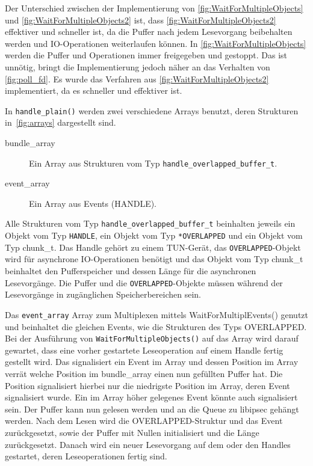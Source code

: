 {Der Unterschied zwischen der Implementierung von \autoref{fig:WaitForMultipleObjects}
und \autoref{fig:WaitForMultipleObjects2} ist, dass \autoref{fig:WaitForMultipleObjects2}
effektiver und schneller ist, da die Puffer nach jedem Lesevorgang beibehalten werden
und IO-Operationen weiterlaufen können.
In \autoref{fig:WaitForMultipleObjects} werden die Puffer und Operationen
immer freigegeben und gestoppt. Das ist unnötig, bringt die Implementierung
jedoch näher an das Verhalten von \autoref{fig:poll_fd}.
Es wurde das Verfahren aus \autoref{fig:WaitForMultipleObjects2} implementiert,
da es schneller und effektiver ist.

In \texttt{handle\_plain()} werden zwei verschiedene Arrays benutzt, deren Strukturen in~\autoref{fig:arrays}
dargestellt sind.

\begin{description}
\item[bundle\_array] Ein Array aus Strukturen vom Typ \texttt{handle\_overlapped\_buffer\_t}. 
\item[event\_array] Ein Array aus Events (HANDLE).
\end{description}

Alle Strukturen vom Typ \texttt{handle\_overlapped\_buffer\_t} beinhalten jeweils ein Objekt
vom Typ \texttt{HANDLE}, ein Objekt vom Typ \texttt{*OVERLAPPED} und ein Objekt vom Typ chunk\_t.
Das Handle gehört zu einem TUN-Gerät, das \texttt{OVERLAPPED}-Objekt wird für asynchrone
IO-Operationen benötigt und das Objekt vom Typ chunk\_t beinhaltet den Pufferspeicher und dessen Länge
für die asynchronen Lesevorgänge. Die Puffer und die \texttt{OVERLAPPED}-Objekte
müssen während der Lesevorgänge in zugänglichen Speicherbereichen sein.

Das \texttt{event\_array} Array zum Multiplexen mittels WaitForMultiplEvents() genutzt und
beinhaltet die gleichen Events, wie die Strukturen des Typs OVERLAPPED.
Bei der Ausführung von \texttt{WaitForMultipleObjects()} auf das Array wird darauf gewartet, dass
eine vorher gestartete Leseoperation auf einem Handle fertig gestellt wird.
Das signalisiert ein Event im Array und dessen Position im Array verrät welche
Position im bundle\_array einen nun gefüllten Puffer hat. Die Position signalisiert
hierbei nur die niedrigste Position im Array, deren Event signalisiert wurde. Ein
im Array höher gelegenes Event könnte auch signalisiert sein.
Der Puffer kann nun gelesen
werden und an die Queue zu libipsec gehängt werden. Nach dem Lesen wird die OVERLAPPED-Struktur
und das Event zurückgesetzt, sowie der Puffer mit Nullen initialisiert und die Länge zurückgesetzt.
Danach wird ein neuer Lesevorgang auf dem oder den Handles gestartet, deren Leseoperationen
fertig sind.

}
